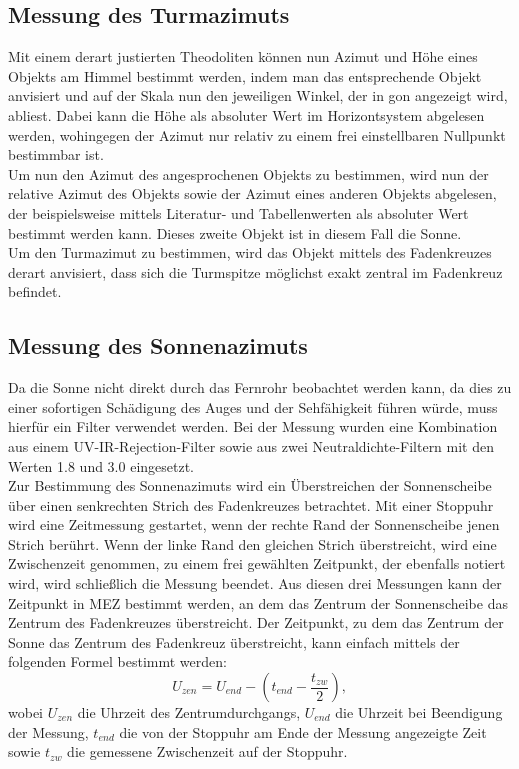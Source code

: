 \subsection{Messung des Turmazimuts}
Mit einem derart justierten Theodoliten können nun Azimut und Höhe eines Objekts am Himmel bestimmt werden, indem man das entsprechende Objekt anvisiert und auf der Skala nun den jeweiligen Winkel, der in gon angezeigt wird, abliest. Dabei kann die Höhe als absoluter Wert im Horizontsystem abgelesen werden, wohingegen der Azimut nur relativ zu einem frei einstellbaren Nullpunkt bestimmbar ist. \\
Um nun den Azimut des angesprochenen Objekts zu bestimmen, wird nun der relative Azimut des Objekts sowie der Azimut eines anderen Objekts abgelesen, der beispielsweise mittels Literatur- und Tabellenwerten als absoluter Wert bestimmt werden kann. Dieses zweite Objekt ist in diesem Fall die Sonne. \\
Um den Turmazimut zu bestimmen, wird das Objekt mittels des Fadenkreuzes derart anvisiert, dass sich die Turmspitze möglichst exakt zentral im Fadenkreuz befindet. \\

\subsection{Messung des Sonnenazimuts}
Da die Sonne nicht direkt durch das Fernrohr beobachtet werden kann, da dies zu einer sofortigen Schädigung des Auges und der Sehfähigkeit führen würde, muss hierfür ein Filter verwendet werden. Bei der Messung wurden eine Kombination aus einem UV-IR-Rejection-Filter sowie aus zwei Neutraldichte-Filtern mit den Werten 1.8 und 3.0 eingesetzt. \\ 
Zur Bestimmung des Sonnenazimuts wird ein Überstreichen der Sonnenscheibe über einen senkrechten Strich des Fadenkreuzes betrachtet. Mit einer Stoppuhr wird eine Zeitmessung gestartet, wenn der rechte Rand der Sonnenscheibe jenen Strich berührt. Wenn der linke Rand den gleichen Strich überstreicht, wird eine Zwischenzeit genommen, zu einem frei gewählten Zeitpunkt, der ebenfalls notiert wird, wird schließlich die Messung beendet. Aus diesen drei Messungen kann der Zeitpunkt in MEZ bestimmt werden, an dem das Zentrum der Sonnenscheibe das Zentrum des Fadenkreuzes überstreicht. Der Zeitpunkt, zu dem das Zentrum der Sonne das Zentrum des Fadenkreuz überstreicht, kann einfach mittels der folgenden Formel bestimmt werden: 
\begin{equation}
U_{zen} = U_{end} - (t_{end} - \frac {t_{zw}}{2}), 
\end{equation}
wobei $U_{zen}$ die Uhrzeit des Zentrumdurchgangs, $U_{end}$ die Uhrzeit bei Beendigung der Messung, $t_{end}$ die von der Stoppuhr am Ende der Messung angezeigte Zeit sowie $t_{zw}$ die gemessene Zwischenzeit auf der Stoppuhr. 

